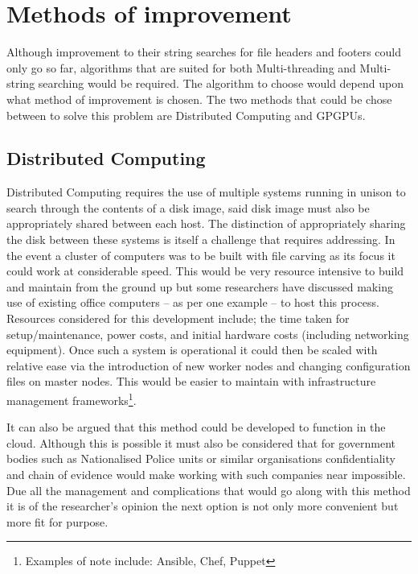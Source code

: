 \section{Methods of improvement}
Although improvement to their string searches for file headers and footers could only go so far, algorithms that are suited for both Multi-threading and Multi-string searching would be required.
The algorithm to choose would depend upon what method of improvement is chosen.
The two methods that could be chose between to solve this problem are Distributed Computing and \acl{GPGPU}s.

\subsection*{Distributed Computing}
Distributed Computing requires the use of multiple systems running in unison to search through the contents of a disk image, said disk image must also be appropriately shared between each host.
The distinction of appropriately sharing the disk between these systems is itself a challenge that requires addressing.
In the event a cluster of computers was to be built with file carving as its focus it could work at considerable speed.
This would be very resource intensive to build and maintain from the ground up but some researchers have discussed making use of existing office computers -- as per one example -- to host this process.
Resources considered for this development include; the time taken for setup/maintenance, power costs, and initial hardware costs (including networking equipment).
Once such a system is operational it could then be scaled with relative ease via the introduction of new worker nodes and changing configuration files on master nodes.
This would be easier to maintain with infrastructure management frameworks\footnote{Examples of note include: Ansible, Chef, Puppet}.

It can also be argued that this method could be developed to function in the cloud.
Although this is possible it must also be considered that for government bodies such as Nationalised Police units or similar organisations confidentiality and chain of evidence would make working with such companies near impossible.
Due all the management and complications that would go along with this method it is of the researcher’s opinion the next option is not only more convenient but more fit for purpose.

